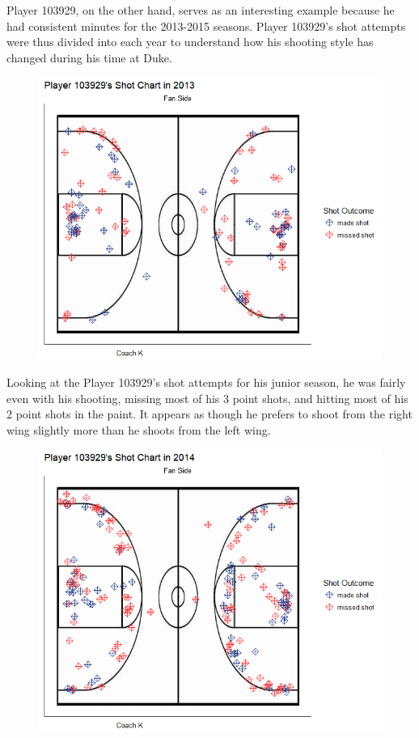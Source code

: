 \documentclass[12pt,twoside]{dukestatscithesis}
\theoremstyle{definition}
\theoremstyle{definition}
\theoremstyle{definition}
\theoremstyle{remark}
\begin{document}
Player 103929, on the other hand, serves as an interesting example
because he had consistent minutes for the 2013-2015 seasons. Player
103929's shot attempts were thus divided into each year to understand
how his shooting style has changed during his time at Duke.
\begin{figure}
\centering
\includegraphics{img/qc2013.png}
\caption{}
\end{figure}
Looking at the Player 103929's shot attempts for his junior season, he
was fairly even with his shooting, missing most of his 3 point shots,
and hitting most of his 2 point shots in the paint. It appears as though
he prefers to shoot from the right wing slightly more than he shoots
from the left wing.
\begin{figure}
\centering
\includegraphics{img/qc2014.png}
\caption{}
\end{figure}
\end{document}
